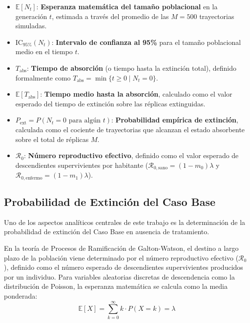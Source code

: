 \documentclass[graybox]{SNmult}
\begin{document}
	\begin{itemize}
		\item $\mathbb{E}[N_t]$: \textbf{Esperanza matemática del tamaño poblacional} en la generación $t$, estimada a través del promedio de las $M=500$ trayectorias simuladas.
		\item $\text{IC}_{95\%}(N_t)$: \textbf{Intervalo de confianza al 95\%} para el tamaño poblacional medio en el tiempo $t$.
		\item $T_{\text{abs}}$: \textbf{Tiempo de absorción} (o tiempo hasta la extinción total), definido formalmente como $T_{\text{abs}} = \min \{ t \ge 0 \mid N_t = 0 \}$.
		\item $\mathbb{E}[T_{\text{abs}}]$: \textbf{Tiempo medio hasta la absorción}, calculado como el valor esperado del tiempo de extinción sobre las réplicas extinguidas.
		\item $P_{\text{ext}} = P(N_t = 0 \text{ para algún } t)$: \textbf{Probabilidad empírica de extinción}, calculada como el cociente de trayectorias que alcanzan el estado absorbente sobre el total de réplicas $M$.
		\item $\mathcal{R}_0$: \textbf{Número reproductivo efectivo}, definido como el valor esperado de descendientes supervivientes por habitante ($\mathcal{R}_{0,\text{sano}} = (1-m_0)\lambda$ y $\mathcal{R}_{0,\text{enfermo}} = (1-m_1)\lambda$).
	\end{itemize}
	
	\subsection{Probabilidad de Extinción del Caso Base}
	\label{subsec:probabilidad_extincion_caso_base}
	
	Uno de los aspectos analíticos centrales de este trabajo es la determinación de la probabilidad de extinción del Caso Base en ausencia de tratamiento.
	
	En la teoría de Procesos de Ramificación de Galton-Watson, el destino a largo plazo de la población viene determinado por el número reproductivo efectivo ($\mathcal{R}_0$), definido como el número esperado de descendientes supervivientes producidos por un individuo. Para variables aleatorias discretas de descendencia como la distribución de Poisson, la esperanza matemática se calcula como la media ponderada:
	\begin{equation}
		\mathbb{E}[X] = \sum_{k=0}^{\infty} k \cdot P(X = k) = \lambda
	\end{equation}
	
\end{document}
